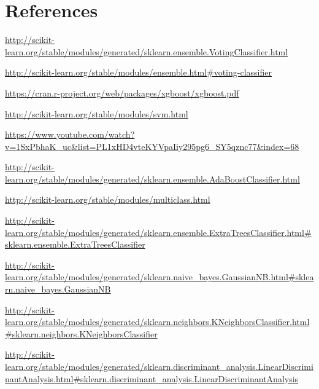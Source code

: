 \documentclass[12pt]{report}
\begin{document}
\newpage
\section*{References}

\begin{sloppypar}

\url{http://scikit-learn.org/stable/modules/generated/sklearn.ensemble.VotingClassifier.html}
\newline
\noindent


\url{http://scikit-learn.org/stable/modules/ensemble.html#voting-classifier}
\newline
\noindent


 \url{https://cran.r-project.org/web/packages/xgboost/xgboost.pdf}
\newline
\noindent


 \url{http://scikit-learn.org/stable/modules/svm.html}
\newline
\noindent


 \url{https://www.youtube.com/watch?v=1SxPbhaK_uc&list=PL1xHD4vteKYVpaIiy295pg6_SY5qznc77&index=68}
\newline
\noindent


 \url{http://scikit-learn.org/stable/modules/generated/sklearn.ensemble.AdaBoostClassifier.html}
\newline
\noindent


 \url{http://scikit-learn.org/stable/modules/multiclass.html}
\newline
\noindent

 \url{http://scikit-learn.org/stable/modules/generated/sklearn.ensemble.ExtraTreesClassifier.html#sklearn.ensemble.ExtraTreesClassifier}
\newline
\noindent


\url{http://scikit-learn.org/stable/modules/generated/sklearn.naive_bayes.GaussianNB.html#sklearn.naive_bayes.GaussianNB}
\newline
\noindent


 \url{http://scikit-learn.org/stable/modules/generated/sklearn.neighbors.KNeighborsClassifier.html#sklearn.neighbors.KNeighborsClassifier}
\newline
\noindent


 \url{http://scikit-learn.org/stable/modules/generated/sklearn.discriminant_analysis.LinearDiscriminantAnalysis.html#sklearn.discriminant_analysis.LinearDiscriminantAnalysis}
\newline
\noindent



\end{sloppypar}
\end{document}
